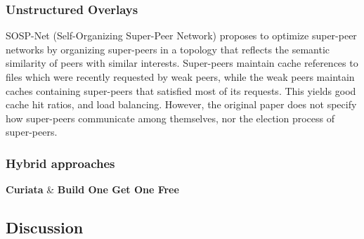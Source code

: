 \subsubsection{Unstructured Overlays}



SOSP-Net (Self-Organizing Super-Peer Network) \cite{garbacki2007optimizing} proposes to optimize super-peer networks by organizing super-peers in a topology that reflects the semantic similarity of peers with similar interests. Super-peers maintain cache references to files which were recently requested by weak peers, while the weak peers maintain caches containing super-peers that satisfied most of its requests. This yields good cache hit ratios, and load balancing. However, the original paper does not specify how super-peers communicate among themselves, nor the election process of super-peers.

\subsubsection{Hybrid approaches}

\textbf{Curiata} \& \textbf{Build One Get One Free}

\subsection{Discussion}






